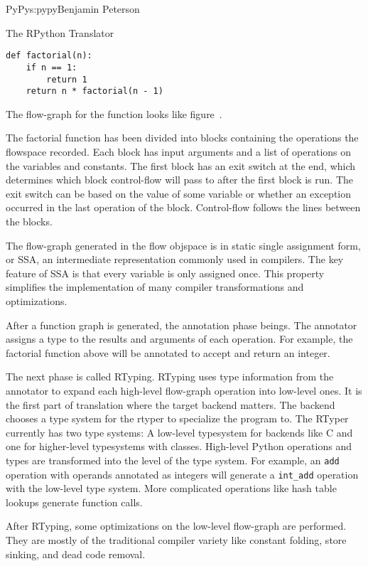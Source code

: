 \begin{aosachapter}{PyPy}{s:pypy}{Benjamin Peterson}
\begin{aosasect1}{The RPython Translator}
\begin{verbatim}
def factorial(n):
    if n == 1:
        return 1
    return n * factorial(n - 1)
\end{verbatim}

The flow-graph for the function looks like
figure~.


The factorial function has been divided into blocks containing the operations
the flowspace recorded. Each block has input arguments and a list of operations
on the variables and constants. The first block has an exit switch at the end,
which determines which block control-flow will pass to after the first block is
run. The exit switch can be based on the value of some variable or whether an
exception occurred in the last operation of the block. Control-flow follows the
lines between the blocks.

The flow-graph generated in the flow objspace is in static single assignment
form, or SSA, an intermediate representation commonly used in compilers. The key
feature of SSA is that every variable is only assigned once. This property
simplifies the implementation of many compiler transformations and
optimizations.

After a function graph is generated, the annotation phase beings. The annotator
assigns a type to the results and arguments of each operation. For example, the
factorial function above will be annotated to accept and return an integer.

The next phase is called RTyping. RTyping uses type information from the
annotator to expand each high-level flow-graph operation into low-level ones. It
is the first part of translation where the target backend matters. The backend
chooses a type system for the rtyper to specialize the program to. The RTyper
currently has two type systems: A low-level typesystem for backends like C and
one for higher-level typesystems with classes. High-level Python operations and
types are transformed into the level of the type system. For example, an
\verb+add+ operation with operands annotated as integers will generate a
\verb+int_add+ operation with the low-level type system. More complicated
operations like hash table lookups generate function calls.

After RTyping, some optimizations on the low-level flow-graph are
performed. They are mostly of the traditional compiler variety like constant
folding, store sinking, and dead code removal.


\end{aosasect1}
\end{aosachapter}
